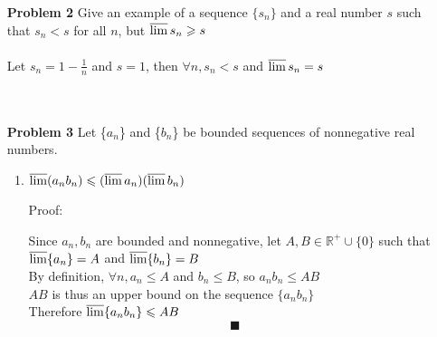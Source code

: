 \documentclass[a4paper,12pt]{report}
\begin{document}
\begin{enumerate}
\begin{enumerate}
	\end{enumerate}

\item[\bf{Problem 2}] Give an example of a sequence $\{s_n\}$ and a real number $s$ such that $s_n < s$ for all $n$, but $\varlimsup s_n \geqslant s$ \\\\
	Let $s_n = 1-\frac{1}{n}$ and $s = 1$, then $\forall n, s_n < s$ and $\varlimsup s_n = s$
	\\\\\\
	
\item[\bf{Problem 3}] Let \{$a_n$\} and \{$b_n$\} be bounded sequences of nonnegative real numbers.
	\begin{enumerate}
	\item $\varlimsup(a_n b_n) \leqslant (\varlimsup a_n)(\varlimsup b_n)$ \\
	\item[Proof:]
	
	Since $a_n, b_n$ are bounded and nonnegative, let $A,B \in \mathbb{R}^+ \cup  \{0\}$ such that $\varlimsup \{a_n\} = A$ and $\varlimsup \{b_n\} = B$ \\
	By definition, $\forall n, a_n \leqslant A$ and $b_n \leqslant B$, so $a_n b_n \leqslant AB$ \\
	$AB$ is thus an upper bound on the sequence $\{a_n b_n\}$ \\ 
	Therefore $\varlimsup \{a_n b_n\} \leqslant AB$	
	\[\blacksquare\]
	\\\\\\
	\end{enumerate}	
	

\end{enumerate}
\end{document}
